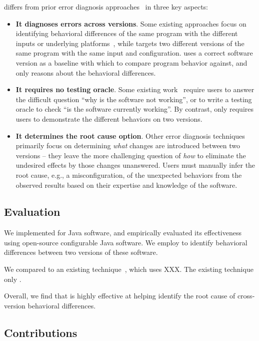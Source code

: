 \ourtool differs from prior error diagnosis approaches~\cite{} in three
key aspects:
\begin{itemize}
\item \textbf{It diagnoses errors across versions}.
Some existing approaches focus on identifying behavioral differences of
the same program with the different inputs or underlying platforms~\cite{},
while \ourtool targets two different versions of the same program with
the same input and configuration. \ourtool uses a correct software version
as a baseline with which to compare program behavior against, and only
reasons about the behavioral differences.


\item \textbf{It requires no testing oracle}.
Some existing work~\cite{} require users to answer the difficult
question ``why is the software not working'', or to
write a testing oracle to check ``is the software
currently working''. By contrast, \ourtool only requires users to
demonstrate the different behaviors on two versions.

\item \textbf{It determines the root cause option}. Other error diagnosis techniques primarily focus on
determining \textit{what} changes are introduced between
two versions -- they leave the more challenging
question of \textit{how} to eliminate the undesired effects
by those changes unanswered. Users must manually infer
the root cause, e.g., a misconfiguration,
of the unexpected behaviors from the
observed results based on their expertise and knowledge
of the software.

\end{itemize}

\subsection{Evaluation}

We implemented \ourtool for Java software, and empirically evaluated
its effectiveness using \subjnum open-source configurable Java
software. We employ \ourtool to identify behavioral differences between
two versions of these software.

We compared \ourtool to an existing technique~\cite{}, which uses XXX.
The existing technique only .

Overall, we find that \ourtool is highly effective at helping
identify the root cause of cross-version behavioral differences. 

\subsection{Contributions}

